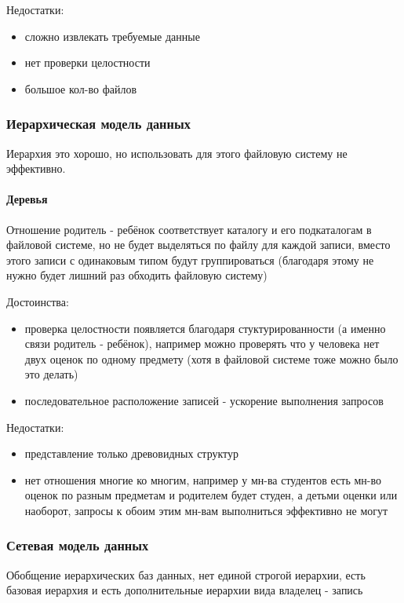 Недостатки:
\begin{itemize}
	\item сложно извлекать требуемые данные
	\item нет проверки целостности
	\item большое кол-во файлов
\end{itemize}

\subsubsection{Иерархическая модель данных}
\begin{remark}
	Иерархия это хорошо, но использовать для этого файловую систему не эффективно.
\end{remark}

\paragraph{Деревья}
Отношение родитель - ребёнок соответствует каталогу и его подкаталогам в файловой системе, но не будет выделяться по файлу для каждой записи, вместо этого записи с одинаковым типом будут группироваться (благодаря этому не нужно будет лишний раз обходить файловую систему)

\enewline

Достоинства:
\begin{itemize}
	\item проверка целостности появляется благодаря стуктурированности (а именно связи родитель - ребёнок), например можно проверять что у человека нет двух оценок по одному предмету (хотя в файловой системе тоже можно было это делать)
	\item последовательное расположение записей - ускорение выполнения запросов
\end{itemize}

Недостатки:
\begin{itemize}
	\item представление только древовидных структур
	\item нет отношения многие ко многим, например у мн-ва студентов есть мн-во оценок по разным предметам и родителем будет студен, а детьми оценки или наоборот, запросы к обоим этим мн-вам выполниться эффективно не могут
\end{itemize}

\subsubsection{Сетевая модель данных}
Обобщение иерархических баз данных, нет единой строгой иерархии, есть базовая иерархия и есть дополнительные иерархии вида владелец - запись

